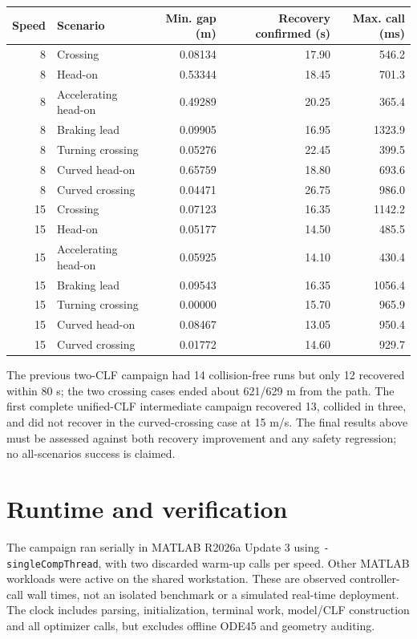 \documentclass[11pt]{article}
\begin{document}
\begin{center}\small
\begin{tabular}{rlrrr}\toprule
Speed & Scenario & Min. gap (m) & Recovery confirmed (s) & Max. call (ms)\\\midrule
8 & Crossing & 0.08134 & 17.90 & 546.2 \\
8 & Head-on & 0.53344 & 18.45 & 701.3 \\
8 & Accelerating head-on & 0.49289 & 20.25 & 365.4 \\
8 & Braking lead & 0.09905 & 16.95 & 1323.9 \\
8 & Turning crossing & 0.05276 & 22.45 & 399.5 \\
8 & Curved head-on & 0.65759 & 18.80 & 693.6 \\
8 & Curved crossing & 0.04471 & 26.75 & 986.0 \\
15 & Crossing & 0.07123 & 16.35 & 1142.2 \\
15 & Head-on & 0.05177 & 14.50 & 485.5 \\
15 & Accelerating head-on & 0.05925 & 14.10 & 430.4 \\
15 & Braking lead & 0.09543 & 16.35 & 1056.4 \\
15 & Turning crossing & 0.00000 & 15.70 & 965.9 \\
15 & Curved head-on & 0.08467 & 13.05 & 950.4 \\
15 & Curved crossing & 0.01772 & 14.60 & 929.7 \\
\bottomrule\end{tabular}\end{center}

The previous two-CLF campaign had 14 collision-free runs but only 12 recovered
within 80 s; the two crossing cases ended about 621/629 m from the path.
The first complete unified-CLF intermediate campaign recovered 13, collided
in three, and did not recover in the curved-crossing case at 15 m/s.
The final results above must be assessed against both recovery improvement
and any safety regression; no all-scenarios success is claimed.

\section{Runtime and verification}
The campaign ran serially in MATLAB R2026a Update 3 using
\texttt{-singleCompThread}, with two discarded warm-up calls per speed.
Other MATLAB workloads were active on the shared workstation. These are
observed controller-call wall times, not an isolated benchmark or a simulated
real-time deployment. The clock includes parsing, initialization, terminal
work, model/CLF construction and all optimizer calls, but excludes offline
ODE45 and geometry auditing.
\end{document}
